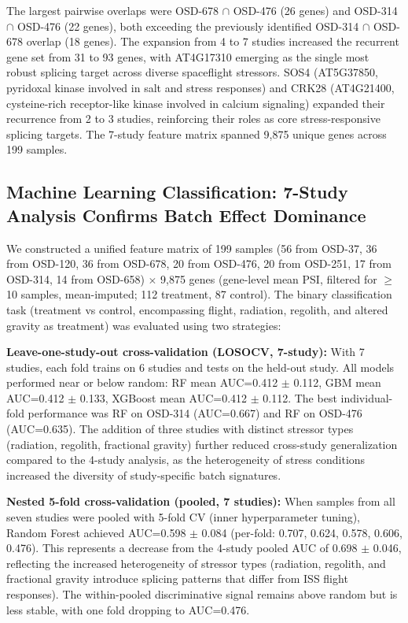 \documentclass[12pt,a4paper]{article}
\begin{document}
The largest pairwise overlaps were OSD-678 $\cap$ OSD-476 (26 genes) and OSD-314 $\cap$ OSD-476 (22 genes), both exceeding the previously identified OSD-314 $\cap$ OSD-678 overlap (18 genes). The expansion from 4 to 7 studies increased the recurrent gene set from 31 to 93 genes, with AT4G17310 emerging as the single most robust splicing target across diverse spaceflight stressors. SOS4 (AT5G37850, pyridoxal kinase involved in salt and stress responses) and CRK28 (AT4G21400, cysteine-rich receptor-like kinase involved in calcium signaling) expanded their recurrence from 2 to 3 studies, reinforcing their roles as core stress-responsive splicing targets. The 7-study feature matrix spanned 9,875 unique genes across 199 samples.

\subsection{Machine Learning Classification: 7-Study Analysis Confirms Batch Effect Dominance}

We constructed a unified feature matrix of 199 samples (56 from OSD-37, 36 from OSD-120, 36 from OSD-678, 20 from OSD-476, 20 from OSD-251, 17 from OSD-314, 14 from OSD-658) $\times$ 9,875 genes (gene-level mean PSI, filtered for $\geq$10 samples, mean-imputed; 112 treatment, 87 control). The binary classification task (treatment vs control, encompassing flight, radiation, regolith, and altered gravity as treatment) was evaluated using two strategies:

\textbf{Leave-one-study-out cross-validation (LOSOCV, 7-study):} With 7 studies, each fold trains on 6 studies and tests on the held-out study. All models performed near or below random: RF mean AUC=0.412 $\pm$ 0.112, GBM mean AUC=0.412 $\pm$ 0.133, XGBoost mean AUC=0.412 $\pm$ 0.112. The best individual-fold performance was RF on OSD-314 (AUC=0.667) and RF on OSD-476 (AUC=0.635). The addition of three studies with distinct stressor types (radiation, regolith, fractional gravity) further reduced cross-study generalization compared to the 4-study analysis, as the heterogeneity of stress conditions increased the diversity of study-specific batch signatures.

\textbf{Nested 5-fold cross-validation (pooled, 7 studies):} When samples from all seven studies were pooled with 5-fold CV (inner hyperparameter tuning), Random Forest achieved AUC=0.598 $\pm$ 0.084 (per-fold: 0.707, 0.624, 0.578, 0.606, 0.476). This represents a decrease from the 4-study pooled AUC of 0.698 $\pm$ 0.046, reflecting the increased heterogeneity of stressor types (radiation, regolith, and fractional gravity introduce splicing patterns that differ from ISS flight responses). The within-pooled discriminative signal remains above random but is less stable, with one fold dropping to AUC=0.476.
\end{document}
